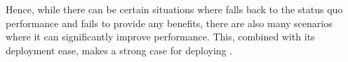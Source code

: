 \vspace{0.05in}
\noindent Hence, while there can be certain situations where \name falls back to the status quo performance  and fails to provide any benefits, there are also many scenarios where it can significantly improve performance. This, combined with its deployment ease, makes a strong case for deploying \name. 




